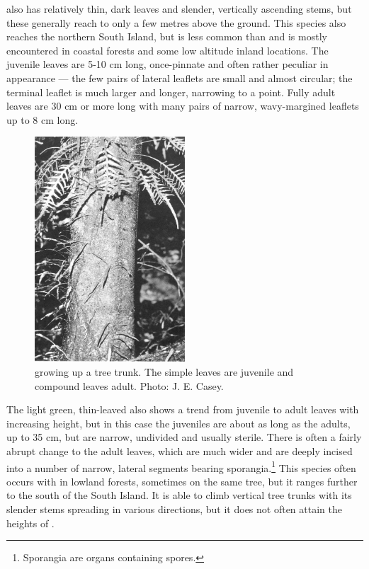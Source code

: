  also has relatively thin, dark leaves and slender, vertically ascending stems, but these generally reach to only a few metres above the ground.
This species also reaches the northern South Island, but is less common than  and is mostly encountered in coastal forests and some low altitude inland locations.
The juvenile leaves are 5-10 cm long, once-pinnate and often rather peculiar in appearance — the few pairs of lateral leaflets are small and almost circular; the terminal leaflet is much larger and longer, narrowing to a point.
Fully adult leaves are 30 cm or more long with many pairs of narrow, wavy-margined leaflets up to 8 cm long.

\begin{figure}
	\includegraphics[width=0.5\textwidth]{graphics/figure29scandens.jpg}
	\centering
	\caption[Phymatosorus scandens growing up a tree trunk]{ growing up a tree trunk.
The simple leaves are juvenile and compound leaves adult.
	Photo: J. E. Casey.}
	\label{fig:29scandens}
\end{figure}

The light green, thin-leaved  also shows a trend from juvenile to adult leaves with increasing height, but in this case the juveniles are about as long as the adults, up to 35 cm, but are narrow, undivided and usually sterile.
There is often a fairly abrupt change to the adult leaves, which are much wider and are deeply incised into a number of narrow, lateral segments bearing sporangia.\footnote{Sporangia are organs containing spores.}
This species often occurs with  in lowland forests, sometimes on the same tree, but it ranges further to the south of the South Island.
It is able to climb vertical tree trunks with its slender stems spreading in various directions, but it does not often attain the heights of .

